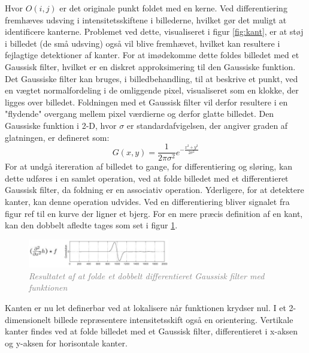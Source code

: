 Hvor $O(i,j)$ er det originale punkt foldet med en kerne. Ved differentiering fremhæves udsving i intensitetsskiftene i billederne, hvilket gør det muligt at identificere kanterne. Problemet ved dette, visualiseret i figur \ref{fig:kant}, er at støj i billedet (de små udsving) også vil blive fremhævet, hvilket kan resultere i fejlagtige detektioner af kanter. For at imødekomme dette foldes billedet med et Gaussisk filter, hvilket er en diskret approksimering til den Gaussiske funktion. Det Gaussiske filter kan bruges, i billedbehandling, til at beskrive et punkt, ved en vægtet normalfordeling i de omliggende pixel, visualiseret som en klokke, der ligges over billedet. Foldningen med et Gaussisk filter vil derfor resultere i en "flydende" overgang mellem pixel værdierne og derfor glatte billedet.  Den Gaussiske funktion i 2-D, hvor $ \sigma $ er standardafvigelsen, der angiver graden af glatningen, er defineret som:
\begin{equation}
G(x,y) = \frac{1}{2 \pi \sigma ^{2}} e^{- \frac{x^{2} + y^{2}}{2 \sigma ^{2}}}
\label{2dgaussian}
\end{equation} 
For at undgå itereration af billedet to gange, for differentiering og sløring, kan dette udføres i en samlet operation, ved at folde billedet med et differentieret Gaussisk filter, da foldning er en associativ operation. Yderligere, for at detektere kanter, kan denne operation udvides. Ved en differentiering bliver signalet fra figur ref til en kurve der ligner et bjerg. For en mere præcis definition af en kant, kan den dobbelt afledte tages som set i figur \ref{fig:deriv}.
\begin{figure}[H]
    \centering
    \includegraphics[width=0.55\textwidth]{fig/8.png}
    \vspace{-1em}   
    \begin{center}
    \caption{\textcolor{gray}{\footnotesize \textit{
     Resultatet af at folde et dobbelt differentieret Gaussisk filter med funktionen}}}
    \label{fig:deriv}
     \end{center}
    \vspace{-2.5em}  
  \end{figure}
\noindent
Kanten er nu let definerbar ved at lokalisere når funktionen krydser nul. I et 2-dimensionelt billede repræsentere intensitetsskift også en orientering. Vertikale kanter findes ved at folde billedet med et Gaussisk filter, differentieret i x-aksen og y-aksen for horisontale kanter.
